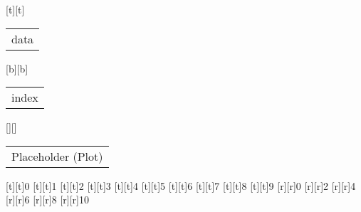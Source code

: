 %
%
\psfragscanon%
%
[t][t]{\color[rgb]{0.15,0.15,0.15}\setlength{\tabcolsep}{0pt}\begin{tabular}{c}data\end{tabular}}%
[b][b]{\color[rgb]{0.15,0.15,0.15}\setlength{\tabcolsep}{0pt}\begin{tabular}{c}index\end{tabular}}%
[][]{\color[rgb]{0,0,0}\setlength{\tabcolsep}{0pt}\begin{tabular}{c}Placeholder (Plot)\end{tabular}}%
%
\color[rgb]{0.15,0.15,0.15}%
%
[t][t]{0}%
[t][t]{1}%
[t][t]{2}%
[t][t]{3}%
[t][t]{4}%
[t][t]{5}%
[t][t]{6}%
[t][t]{7}%
[t][t]{8}%
[t][t]{9}%
%
[r][r]{0}%
[r][r]{2}%
[r][r]{4}%
[r][r]{6}%
[r][r]{8}%
[r][r]{10}%
%
%

